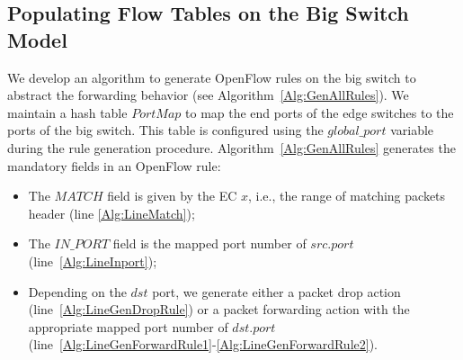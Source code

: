 \subsection{Populating Flow Tables on the Big Switch Model}\label{sec:thirdstep}


We develop an algorithm to generate OpenFlow rules on the big switch to abstract the forwarding behavior (see Algorithm~\ref{Alg:GenAllRules}).
We maintain a hash table $PortMap$ to map the end ports of the edge switches to the ports of the big switch.
This table is configured using the $global\_port$ variable during the rule generation procedure.
Algorithm~\ref{Alg:GenAllRules} generates the mandatory fields in an OpenFlow rule:
\begin{itemize}
\item The $MATCH$ field is given by the EC $x$, i.e., the range of matching packets header (line \ref{Alg:LineMatch});
\item The $IN\_PORT$ field is the mapped port number of $src.port$ (line~\ref{Alg:LineInport});
\item Depending on the $dst$ port, we generate either a packet drop action (line~\ref{Alg:LineGenDropRule}) or a packet forwarding action with the appropriate mapped port number of $dst.port$ (line~\ref{Alg:LineGenForwardRule1}-\ref{Alg:LineGenForwardRule2}).
\end{itemize}
